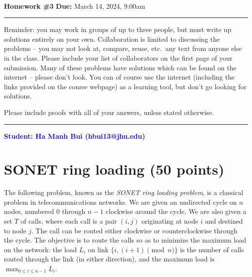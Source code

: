 \documentclass[11pt]{article}
\begin{document}
\\
{{\bf Homework \#3}} \hfill {{\bf Due:} March 14, 2024, 9:00am} \\
\rule[0.1in]{\textwidth}{0.4pt}

Reminder: you may work in groups of up to three people, but must write up solutions entirely on your own.  Collaboration is limited to discussing the problems -- you may not look at, compare, reuse, etc.~any text from anyone else in the class.  Please include your list of collaborators on the first page of your submission.  Many of these problems have solutions which can be found on the internet -- please don't look.  You can of course use the internet (including the links provided on the course webpage) as a learning tool, but don't go looking for solutions.  

Please include proofs with all of your answers, unless stated otherwise.

\noindent \rule[0.1in]{\textwidth}{0.4pt}

\begin{center}
    \textbf{\textcolor{blue}{Student: Ha Manh Bui (hbui13@jhu.edu)}}
\end{center}

\section{SONET ring loading (50 points)}
The following problem, known as the \emph{SONET ring loading problem}, is a classical problem in telecommunications networks.  We are given an undirected cycle on $n$ nodes, numbered $0$ through $n-1$ clockwise around the cycle.  We are also given a set $T$ of calls, where each call is a pair $(i,j)$ originating at node $i$ and destined to node $j$.  The call can be routed either clockwise or counterclockwise through the cycle.  The objective is to route the calls so as to minimize the maximum load on the network: the load $L_i$ on link $\{i, (i+1)\pmod n\}$ is the number of calls routed through the link (in either direction), and the maximum load is $\max_{0 \leq i \leq n-1} L_i$.  
\end{document}
